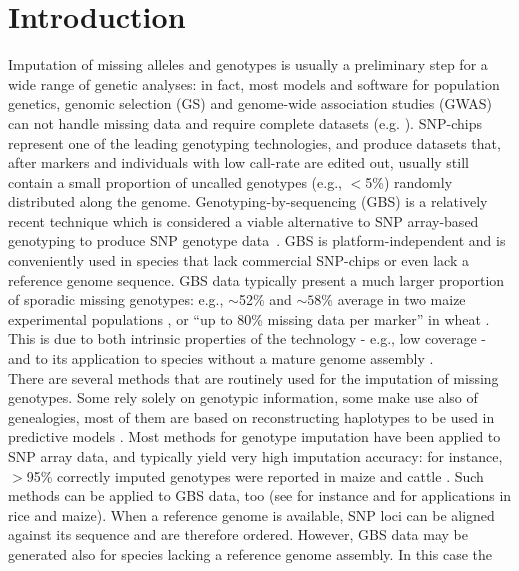 \section{Introduction}
\label{intro}

Imputation of missing alleles and genotypes is usually a preliminary step for
a wide range of genetic analyses: in fact, most models and software for 
population genetics, genomic selection (GS) and genome-wide association 
studies (GWAS) can not handle missing data and require complete datasets (e.g. \cite{hayes2009invited}). 
SNP-chips represent one of the leading genotyping technologies, and produce 
datasets that, after markers and individuals with low call-rate are edited out, 
usually still contain a small proportion of uncalled genotypes (e.g., $<$5\%) 
randomly distributed along the genome. Genotyping-by-sequencing (GBS) is a 
relatively recent technique which is considered a viable alternative to SNP array-based genotyping to produce SNP genotype data~\cite{elshire_robust_2011}.
GBS is platform-independent and is conveniently 
used in species that lack commercial SNP-chips or even lack a reference 
genome sequence. GBS data typically present a much larger proportion of 
sporadic missing genotypes: e.g., $\sim$52\% and $\sim 58\%$ average in two maize experimental populations \cite{crossa_genomic_2013},
or ``up to 80\% missing data per marker'' in wheat \cite{poland_genomic_2012}. This 
is due to both intrinsic properties of the technology - e.g., low coverage - 
and to its application to species without a mature genome assembly \cite{glaubitz_tassel-gbs:_2014}.\\
There are several methods that are routinely used for the imputation of 
missing genotypes. Some rely solely on genotypic information, some make 
use also of genealogies, most of them are based on reconstructing haplotypes 
to be used in predictive models \cite{nicolazzi_software_2015}. Most methods for 
genotype imputation have been applied to SNP array data, and typically 
yield very high imputation accuracy: for instance, $>$95\% correctly imputed 
genotypes were reported in maize \cite{hickey_factors_2012} and cattle \cite{vanraden_genomic_2011}. 
Such methods can be applied to GBS data, too (see for instance 
\cite{huang_efficient_2014} and \cite{swarts_novel_2014} 
for applications in rice and maize). When a reference 
genome is available, SNP loci can be aligned against its sequence and 
are therefore ordered. However, GBS data may be generated 
also for species lacking a reference genome assembly. In this case the 

